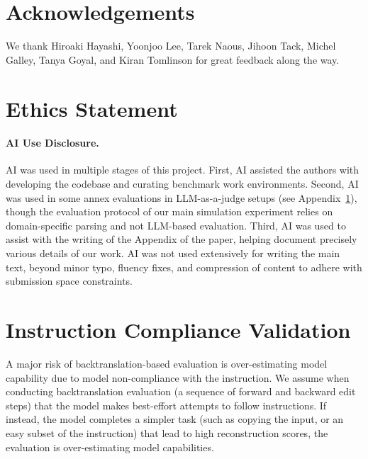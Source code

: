 \documentclass{article} %
\begin{document}
\section*{Acknowledgements}

We thank Hiroaki Hayashi, Yoonjoo Lee, Tarek Naous, Jihoon Tack, Michel Galley, Tanya Goyal, and Kiran Tomlinson for great feedback along the way.

\section*{Ethics Statement} \label{sec:ethics}

\paragraph{AI Use Disclosure.} AI was used in multiple stages of this project. First, AI assisted the authors with developing the codebase and curating benchmark work environments. Second, AI was used in some annex evaluations in LLM-as-a-judge setups (see Appendix~\ref{app:instruction_compliance}), though the evaluation protocol of our main simulation experiment relies on domain-specific parsing and not LLM-based evaluation. Third, AI was used to assist with the writing of the Appendix of the paper, helping document precisely various details of our work. AI was not used extensively for writing the main text, beyond minor typo, fluency fixes, and compression of content to adhere with submission space constraints.




\clearpage
\appendix
\setcounter{figure}{0}
\setcounter{table}{0}
\renewcommand{\thefigure}{A\arabic{figure}}
\renewcommand{\thetable}{A\arabic{table}}
\renewcommand{\theHfigure}{A\arabic{figure}}
\renewcommand{\theHtable}{A\arabic{table}}

\section{Instruction Compliance Validation} \label{app:instruction_compliance}

A major risk of backtranslation-based evaluation is over-estimating model capability due to model non-compliance with the instruction. We assume when conducting backtranslation evaluation (a sequence of forward and backward edit steps) that the model makes best-effort attempts to follow instructions. If instead, the model completes a simpler task (such as copying the input, or an easy subset of the instruction) that lead to high reconstruction scores, the evaluation is over-estimating model capabilities.
\end{document}
